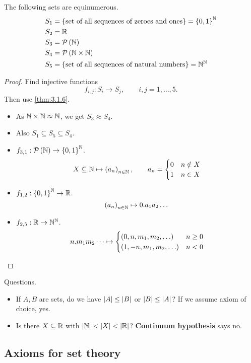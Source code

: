 \begin{example}
The following sets are equinumerous.
\begin{align*}
S_1 & = \left\{ \text{set of all sequences of zeroes and ones} \right\} = \left\{ 0, 1 \right\}^{\mathbb{N}} \\
S_2 & = \mathbb{R} \\
S_3 & = \mathcal{P}\left( \mathbb{N} \right) \\
S_4 & = \mathcal{P}\left( \mathbb{N} \times \mathbb{N} \right) \\
S_5 & = \left\{ \text{set of all sequences of natural numbers} \right\} = \mathbb{N}^{\mathbb{N}}
\end{align*}
\end{example}

\begin{proof}
Find injective functions
$$ f_{i, j} : S_i \to S_j, \qquad i, j = 1, \dots, 5. $$
Then use \ref{thm:3.1.6}.
\begin{itemize}
\item As $ \mathbb{N} \times \mathbb{N} \approx \mathbb{N} $, we get $ S_3 \approx S_4 $.
\item Also $ S_1 \subseteq S_5 \subseteq S_4 $.
\item $ f_{3, 1} : \mathcal{P}\left( \mathbb{N} \right) \to \left\{ 0, 1 \right\}^{\mathbb{N}} $.
$$ X \subseteq \mathbb{N} \mapsto \left( a_n \right)_{n \in \mathbb{N}}, \qquad a_n =
\begin{cases}
0 & n \notin X \\
1 & n \in X
\end{cases}
$$
\item $ f_{1, 2} : \left\{ 0, 1 \right\}^{\mathbb{N}} \to \mathbb{R} $.
$$ \left( a_n \right)_{n \in \mathbb{N}} \mapsto 0 . a_1a_2 \dots $$
\item $ f_{2, 5} : \mathbb{R} \to \mathbb{N}^{\mathbb{N}} $.
$$ n . m_1m_2 \dots \mapsto
\begin{cases}
\rb{0, n, m_1, m_2, \dots} & n \ge 0 \\
\rb{1, -n, m_1, m_2, \dots} & n < 0
\end{cases}
$$
\end{itemize}
\end{proof}

Questions.
\begin{itemize}
\item If $ A, B $ are sets, do we have $ \left\lvert A \right\rvert \le \left\lvert B \right\rvert $ or $ \left\lvert B \right\rvert \le \left\lvert A \right\rvert $? If we assume axiom of choice, yes.
\item Is there $ X \subseteq \mathbb{R} $ with $ \left\lvert \mathbb{N} \right\rvert < \left\lvert X \right\rvert < \left\lvert \mathbb{R} \right\rvert $? \textbf{Continuum hypothesis} says no.
\end{itemize}

\pagebreak

\subsection{Axioms for set theory}

